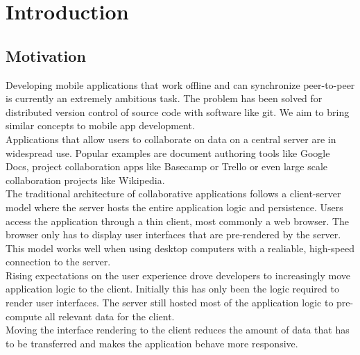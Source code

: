 
\chapter{Introduction}
\label{sec:intro}

\section{Motivation}
Developing mobile applications that work offline and can synchronize peer-to-peer is currently an extremely ambitious task.
The problem has been solved for distributed version control of source code with software like git.
We aim to bring similar concepts to mobile app development.\\

Applications that allow users to collaborate on data on a central server are in widespread use.
Popular examples are document authoring tools like Google Docs, project collaboration apps like Basecamp or Trello or even large scale collaboration projects like Wikipedia.\\

The traditional architecture of collaborative applications follows a client-server model where the server hosts the entire application logic and persistence.
Users access the application through a thin client, most commonly a web browser.
The browser only has to display user interfaces that are pre-rendered by the server.\\
This model works well when using desktop computers with a realiable, high-speed connection to the server.\\

Rising expectations on the user experience drove developers to increasingly move application logic to the client.
Initially this has only been the logic required to render user interfaces.
The server still hosted most of the application logic to pre-compute all relevant data for the client.\\
Moving the interface rendering to the client reduces the amount of data that has to be transferred and makes the application behave more responsive.\\

